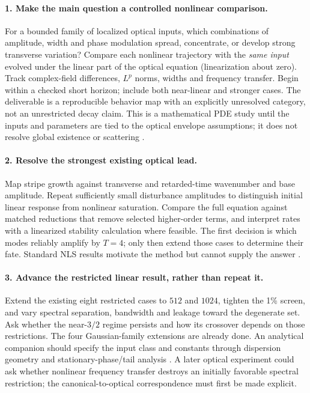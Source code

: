 \documentclass[11pt]{article}
\begin{document}
\paragraph{1. Make the main question a controlled nonlinear comparison.}
For a bounded family of localized optical inputs, which combinations of amplitude, width and phase modulation spread, concentrate, or develop strong transverse variation? Compare each nonlinear trajectory with the \emph{same input} evolved under the linear part of the optical equation (linearization about zero). Track complex-field differences, $L^p$ norms, widths and frequency transfer. Begin within a checked short horizon; include both near-linear and stronger cases. The deliverable is a reproducible behavior map with an explicitly unresolved category, not an unrestricted decay claim. This is a mathematical PDE study until the inputs and parameters are tied to the optical envelope assumptions; it does not resolve global existence or scattering \cite{MPS}.

\paragraph{2. Resolve the strongest existing optical lead.}
Map stripe growth against transverse and retarded-time wavenumber and base amplitude. Repeat sufficiently small disturbance amplitudes to distinguish initial linear response from nonlinear saturation. Compare the full equation against matched reductions that remove selected higher-order terms, and interpret rates with a linearized stability calculation where feasible. The first decision is which modes reliably amplify by $T=4$; only then extend those cases to determine their fate. Standard NLS results motivate the method but cannot supply the answer \cite{RT}.

\paragraph{3. Advance the restricted linear result, rather than repeat it.}
Extend the existing eight restricted cases to $512$ and $1024$, tighten the 1\% screen, and vary spectral separation, bandwidth and leakage toward the degenerate set. Ask whether the near-$3/2$ regime persists and how its crossover depends on those restrictions. The four Gaussian-family extensions are already done. An analytical companion should specify the input class and constants through dispersion geometry and stationary-phase/tail analysis \cite{BAKS,MPS}. A later optical experiment could ask whether nonlinear frequency transfer destroys an initially favorable spectral restriction; the canonical-to-optical correspondence must first be made explicit.
\end{document}
